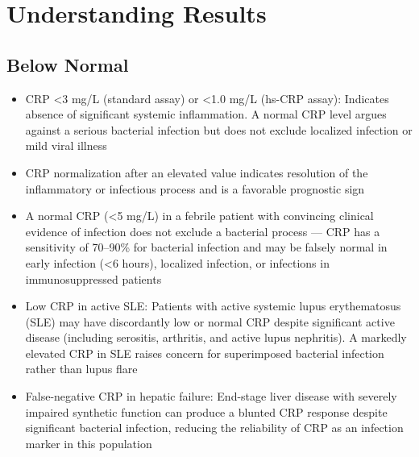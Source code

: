 \section*{Understanding Results}

\subsection*{Below Normal}
\begin{itemize}
  \item CRP <3 mg/L (standard assay) or <1.0 mg/L (hs-CRP assay): Indicates absence of significant systemic inflammation. A normal CRP level argues against a serious bacterial infection but does not exclude localized infection or mild viral illness
  \item CRP normalization after an elevated value indicates resolution of the inflammatory or infectious process and is a favorable prognostic sign
  \item A normal CRP (<5 mg/L) in a febrile patient with convincing clinical evidence of infection does not exclude a bacterial process --- CRP has a sensitivity of 70--90\% for bacterial infection and may be falsely normal in early infection (<6 hours), localized infection, or infections in immunosuppressed patients
  \item Low CRP in active SLE: Patients with active systemic lupus erythematosus (SLE) may have discordantly low or normal CRP despite significant active disease (including serositis, arthritis, and active lupus nephritis). A markedly elevated CRP in SLE raises concern for superimposed bacterial infection rather than lupus flare
  \item False-negative CRP in hepatic failure: End-stage liver disease with severely impaired synthetic function can produce a blunted CRP response despite significant bacterial infection, reducing the reliability of CRP as an infection marker in this population
\end{itemize}

